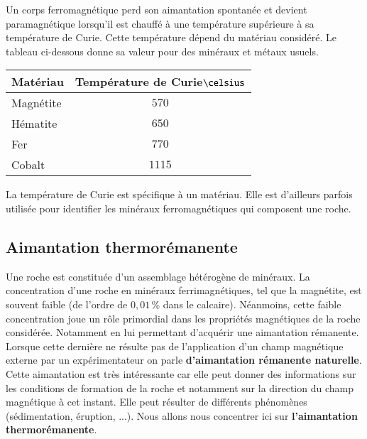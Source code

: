 \begin{defn}
	Un corps ferromagnétique perd son aimantation spontanée et devient 
	paramagnétique lorsqu'il est chauffé à une température supérieure à sa température
	de Curie. Cette température dépend du matériau considéré. Le tableau ci-dessous
	donne sa valeur pour des minéraux et métaux usuels.

	\begin{center}
	\begin{tabular}{l|c}
		\textbf{Matériau} & \textbf{Température de Curie}$\celsius$  \\\hline
		Magnétite 	 & $570$ \\[0.5em]
		Hématite 	 & $650$ \\[0.5em]
		Fer     & $770$\\[0.5em]
		Cobalt     & $1115$\\[0.5em]
	\end{tabular}
	\end{center}
\end{defn}

\begin{rema}
	La température de Curie est spécifique à un matériau. Elle est d'ailleurs parfois
	utilisée pour identifier les minéraux ferromagnétiques qui composent une
	roche.
\end{rema}

\newpage

\subsection{Aimantation thermorémanente}
Une roche est constituée d'un assemblage hétérogène de minéraux. La concentration d'une
roche en minéraux ferrimagnétiques, tel que la magnétite, est souvent faible 
(de l'ordre de $0,01\,\%$ dans le calcaire). Néanmoins, cette faible concentration joue un
rôle primordial dans les propriétés magnétiques de la roche considérée. Notamment
en lui permettant d'acquérir une aimantation rémanente. Lorsque cette dernière
ne résulte pas de l'application d'un champ magnétique externe par un expérimentateur
on parle \textbf{d'aimantation rémanente naturelle}. Cette aimantation est très intéressante
car elle peut donner des informations sur les conditions de formation de la roche
et notamment sur la direction du champ magnétique à cet instant. Elle peut 
résulter de différents phénomènes (sédimentation, éruption, ...). Nous allons
nous concentrer ici sur \textbf{l'aimantation thermorémanente}.

